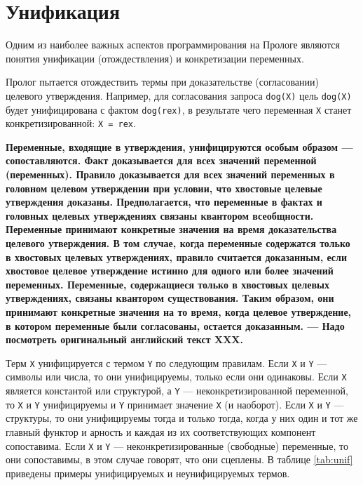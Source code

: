 \documentclass[12pt, openany, twoside]{book} %
\begin{document}
\section{Унификация} Одним из наиболее важных аспектов программирования на Прологе являются понятия унификации (отождествления) и конкретизации переменных.

Пролог пытается отождествить термы при доказательстве (согласовании) целевого утверждения. Например, для согласования запроса {\tt  dog(X)} цель {\tt  dog(X)} будет унифицирована с фактом {\tt dog(rex)}, в результате чего переменная {\tt Х} станет конкретизированной: {\tt Х = rex}.

{\bf{} Переменные, входящие в утверждения, унифицируются особым образом --- сопоставляются. Факт доказывается для всех значений переменной (переменных). Правило доказывается для всех значений переменных в головном целевом утверждении при условии, что хвостовые целевые утверждения доказаны. Предполагается, что переменные в фактах и головных целевых утверждениях связаны квантором всеобщности. Переменные принимают конкретные значения на время доказательства целевого утверждения.
%
В том случае, когда переменные содержатся только в хвостовых целевых утверждениях, правило считается доказанным, если хвостовое целевое утверждение истинно для одного или более значений переменных. Переменные, содержащиеся только в хвостовых целевых утверждениях, связаны квантором существования. Таким образом, они принимают конкретные значения на то время, когда целевое утверждение, в котором переменные были согласованы, остается доказанным. --- Надо посмотреть оригинальный английский текст XXX.}

Терм {\tt X} унифицируется с термом {\tt Y} по следующим правилам. Если {\tt Х} и {\tt Y} --- символы или числа, то они унифицируемы, только если они одинаковы. Если {\tt Х} является константой или структурой, а {\tt Y} --- неконкретизированной переменной, то {\tt Х} и {\tt Y} унифицируемы и {\tt Y} принимает значение {\tt Х} (и наоборот). Если {\tt Х} и {\tt Y} --- структуры, то они унифицируемы тогда и только тогда, когда у них один и тот же главный функтор и арность и каждая из их соответствующих компонент сопоставима. Если {\tt Х} и {\tt Y} --- неконкретизированные (свободные) переменные, то они сопоставимы, в этом случае говорят, что они сцеплены. В таблице \ref{tab:unif} приведены примеры унифицируемых и неунифицируемых термов.
\end{document}
